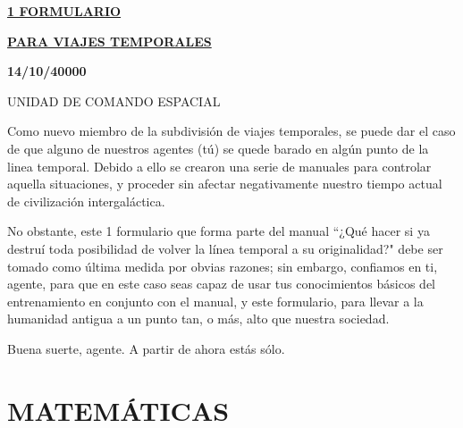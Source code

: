 \documentclass[12pt,letterpaper]{article}
\begin{document}
\pagecolor{black}
\color{white}

\begin{center}
    {\textcolor{Goldenrod1}{\textbf{\textsc{\underline{\Huge{1 FORMULARIO}}}}}}
\end{center}

\begin{center}
    {\textcolor{Goldenrod1}{\textbf{\textsc{\underline{\Huge{PARA VIAJES TEMPORALES}}}}}}
\end{center}

\begin{center}
    {\textcolor{Goldenrod1}{\textbf{\textsc{\large{14/10/40000}}}}}
\end{center}

\begin{center}
    {\textcolor{Goldenrod1}{\textsc{UNIDAD DE COMANDO ESPACIAL}}}
\end{center}

Como nuevo miembro de la subdivisión de viajes temporales, 
se puede dar el caso de que alguno de nuestros agentes (tú) se quede barado en algún punto de la linea temporal. Debido a ello se crearon una serie de manuales para controlar aquella situaciones, y proceder sin afectar negativamente nuestro tiempo actual de civilización intergaláctica.\newline

No obstante, este 1 formulario que forma parte del manual ``¿Qué hacer si ya destruí toda posibilidad de volver la línea temporal a su originalidad?" debe ser tomado como última medida por obvias razones; sin embargo, confiamos en ti, agente, para que en este caso seas capaz de usar tus conocimientos básicos del entrenamiento en conjunto con el manual, y este formulario, para llevar a la humanidad antigua a un punto tan, o más, alto que nuestra sociedad.\newline

Buena suerte, agente. A partir de ahora estás sólo.\newline

\section*{MATEMÁTICAS}
\end{document}
